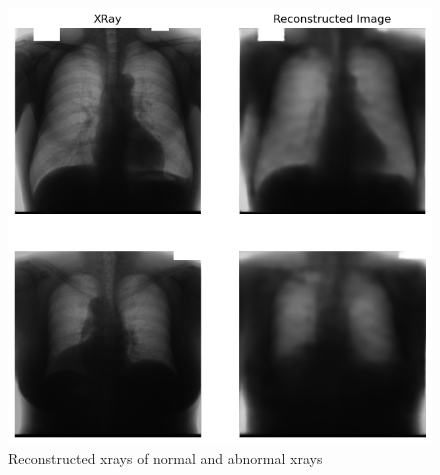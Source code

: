     \begin{figure}[htbp]
        \centering
        \includegraphics[width=\linewidth]{../plots/unsupervised-anamoly/result.png}
        \caption{Reconstructed xrays of normal and abnormal xrays}
        \label{fig:reconstruction-result}
    \end{figure}